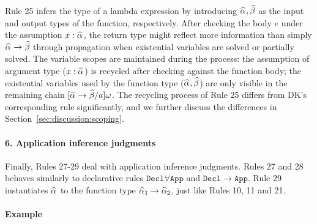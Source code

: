 Rule 25 infers the type of a lambda expression by introducing $\al, \bt$
as the input and output types of the function, respectively.
After checking the body $e$ under the assumption $x:\al$,
the return type might reflect more information than simply $\al \to \bt$
through propagation when existential variables are solved or partially solved.
The variable scopes are maintained during the process:
the assumption of argument type ($x:\al$) is recycled after checking against the function body;
the existential variables used by the function type ($\al,\bt$) are only visible in the remaining chain $[\al\to\bt/a]\jg$.
The recycling process of Rule 25 differs from DK's corresponding rule significantly,
and we further discuss the differences in Section~\ref{sec:discussion:scoping}.


\paragraph{\bf 6. Application inference judgments}
Finally, Rules 27-29 deal with application inference judgments.
Rules 27 and 28 behaves similarly to declarative rules $\mathtt{Decl\forall App}$ and $\mathtt{Decl\to App}$.
Rule 29 instantiates $\al$ to the function type $\al[1] \to \al[2]$, just like Rules 10, 11 and 21.




\paragraph{Example}

